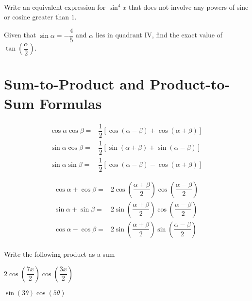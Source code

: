 \newpage

\begin{exercise}
  Write an equivalent expression for $\sin^4 x$ that does not involve any powers of sine or cosine greater than $1$.
\end{exercise}

\begin{exercise}
  Given that $\sin \alpha=-\dfrac{4}{5}$ and $\alpha$ lies in quadrant IV, find the exact value of $\tan\left(\dfrac{\alpha}{2}\right)$.
\end{exercise}

\newpage

\section{Sum-to-Product and Product-to-Sum Formulas}

\begin{corollary}
\begin{align*}
  \cos \alpha \cos \beta =& \dfrac{1}{2}[\cos(\alpha - \beta) + \cos(\alpha + \beta)]\\
  \sin \alpha \cos \beta =& \dfrac{1}{2}[\sin(\alpha+\beta)+\sin(\alpha - \beta)]\\
  \sin \alpha \sin \beta =& \dfrac{1}{2}[\cos(\alpha-\beta)-\cos(\alpha+\beta)]
\end{align*}
\end{corollary}

\begin{corollary}
\begin{align*}
  \cos\alpha + \cos\beta = & 2\cos\left(\dfrac{\alpha+\beta}{2}\right)\cos\left(\dfrac{\alpha-\beta}{2}\right)\\
  \sin\alpha + \sin\beta = & 2\sin\left(\dfrac{\alpha+\beta}{2}\right)\cos\left(\dfrac{\alpha-\beta}{2}\right)\\
  \cos\alpha - \cos\beta = & 2\sin\left(\dfrac{\alpha+\beta}{2}\right)\sin\left(\dfrac{\alpha-\beta}{2}\right)\\
\end{align*}
\end{corollary}

\begin{example}
  Write the following product as a sum\\
  \begin{enumerate*}
    \item $2\cos\left(\dfrac{7x}{2}\right) \cos\left(\dfrac{3x}{2}\right)$
    \item $\sin\left(3\theta\right) \cos\left(5\theta\right)$\hfill\null
  \end{enumerate*}
\end{example}


